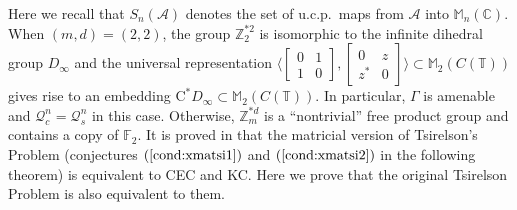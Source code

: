 \documentclass[12pt]{amsart}
\theoremstyle{definition}
\begin{document}
Here we recall that $S_n({{\mathcal A}})$ denotes the set of u.c.p.\ maps from ${{\mathcal A}}$ into ${{\mathbb M}}_n({{\mathbb C}})$.
When $(m,d)=(2,2)$, the group ${{\mathbb Z}}_2^{*2}$ is isomorphic to the infinite dihedral group $D_\infty$
and the universal representation
$\langle\left[\begin{smallmatrix} 0 & 1\\ 1 & 0 \end{smallmatrix}\right],
  \left[\begin{smallmatrix} 0 & z\\ z^* & 0 \end{smallmatrix}\right]\rangle\subset{{\mathbb M}}_2(C({{\mathbb T}}))$
gives rise to an embedding $\mathrm{C}^* D_\infty\subset{{\mathbb M}}_2(C({{\mathbb T}}))$.
In particular, ${\Gamma}$ is amenable and ${{\mathcal Q}}_c^n={{\mathcal Q}}_s^n$ in this case.
Otherwise, ${{\mathbb Z}}_m^{*d}$ is a ``nontrivial'' free product group and contains a copy of ${{\mathbb F}}_2$.
It is proved in \cite{fritz,jungeetal} that the matricial version of Tsirelson's Problem
(conjectures $(\ref{cond:xmatsi1})$ and $(\ref{cond:xmatsi2})$ in the following theorem) is
equivalent to CEC and KC.
Here we prove that the original Tsirelson Problem is also equivalent to them.
\end{document}
